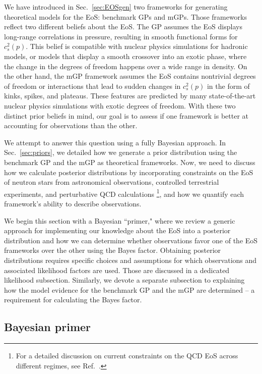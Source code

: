 \documentclass[aps,prd,nofootinbib,tightenlines,notitlepage,floatfix,superscriptaddress,showkeys,twocolumn]{revtex4-1}
\begin{document}
We have introduced in Sec.~\ref{sec:EOSgen} two frameworks for generating theoretical models for the EoS: benchmark GPs and mGPs. Those frameworks reflect two different beliefs about the EoS. The GP assumes the EoS displays long-range correlations in pressure, resulting in smooth functional forms for $c_s^2(p)$. This belief is compatible with nuclear physics simulations for hadronic models, or models that display a smooth crossover into an exotic phase, where the change in the degrees of freedom happens over a wide range in density. On the other hand, the mGP framework assumes the EoS contains nontrivial degrees of freedom or interactions that lead to sudden changes in $c_s^2(p)$ in the form of kinks, spikes, and plateaus. These features are predicted by many state-of-the-art nuclear physics simulations with exotic degrees of freedom. With these two distinct prior beliefs in mind, our goal is to assess if one framework is better at accounting for observations than the other. 

We attempt to answer this question using a fully Bayesian approach. In Sec.~\ref{sec:priors}, we detailed how we generate a prior distribution using the benchmark GP and the mGP as theoretical frameworks. Now, we need to discuss how we calculate posterior distributions by incorporating constraints on the EoS of neutron stars from astronomical observations, controlled terrestrial experiments, and perturbative QCD calculations \footnote{For a detailed discussion on current constraints on the QCD EoS across different regimes, see Ref.~\cite{MUSES:2023hyz}.}, and how we quantify each framework's ability to describe observations.  

We begin this section with a Bayesian ``primer," where we review a generic approach for implementing our knowledge about the EoS into a posterior distribution and how we can determine whether observations favor one of the EoS frameworks over the other using the Bayes factor. Obtaining posterior distributions requires specific choices and assumptions for which observations and associated likelihood factors are used. Those are discussed in a dedicated likelihood subsection. Similarly, we devote a separate subsection to explaining how the model evidence for the benchmark GP and the mGP are determined -- a requirement for calculating the Bayes factor. 


\subsection{Bayesian primer}\label{subsec:primer}
\end{document}
